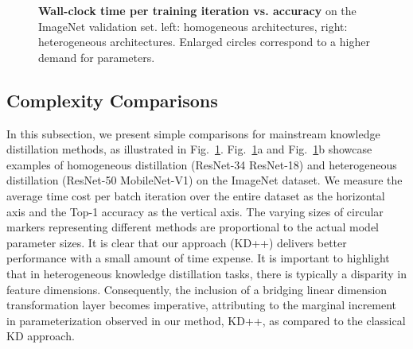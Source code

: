 \documentclass{article}
\begin{document}
\begin{figure}[h]
\centering

\caption{\small
\textbf{Wall-clock time per training iteration vs. accuracy} on the ImageNet validation set. left: homogeneous architectures, right: heterogeneous architectures. Enlarged circles correspond to a higher demand for parameters.
}
\vspace{-2.0mm}
\label{fig:suppl_params_acc}
\end{figure} \subsection{Complexity Comparisons}
In this subsection, we present simple comparisons for mainstream knowledge distillation methods, as illustrated in Fig.~\ref{fig:suppl_params_acc}. Fig.~\ref{fig:suppl_params_acc}a and Fig.~\ref{fig:suppl_params_acc}b showcase examples of homogeneous distillation (ResNet-34  ResNet-18) and heterogeneous distillation (ResNet-50  MobileNet-V1) on the ImageNet dataset. We measure the average time cost per batch iteration over the entire dataset as the horizontal axis and the Top-1 accuracy as the vertical axis. The varying sizes of circular markers representing different methods are proportional to the actual model parameter sizes. It is clear that our approach (KD++) delivers better performance with a small amount of time expense. It is important to highlight that in heterogeneous knowledge distillation tasks, there is typically a disparity in feature dimensions. Consequently, the inclusion of a bridging linear dimension transformation layer becomes imperative, attributing to the marginal increment in parameterization observed in our method, KD++, as compared to the classical KD approach.
\end{document}
